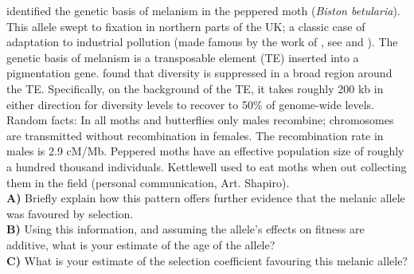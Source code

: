 \begin{question}{}
\citet{van2011industrial}  identified the genetic basis of
melanism in the peppered moth ({\it Biston betularia}). This allele swept to fixation in northern
parts of the UK; a classic case of adaptation to industrial pollution
(made famous by the work of \citeauthor{kettlewell1955selection}, see
\citet{majerus2009industrial} and \citet{cook2012selective}). The genetic basis of melanism
is a transposable element (TE) inserted into a pigmentation gene. \citeauthor{van2011industrial} found that diversity is suppressed in a broad region
around the TE. Specifically, on the background of the TE, it takes
roughly 200 kb in either direction for diversity levels to recover to
50\% of genome-wide levels. \\

Random facts: In all moths and butterflies only males recombine;
chromosomes are transmitted without recombination in females. The
recombination rate in males is 2.9 cM/Mb.  Peppered moths have an
effective population size of roughly a hundred thousand
individuals. Kettlewell used to eat moths when out collecting them in
the field (personal communication, Art. Shapiro). \\
{\bf A)} Briefly explain how this pattern offers further evidence that the melanic allele was favoured by selection.\\
{\bf B)} Using this information, and assuming the allele's effects on fitness are additive, what is your estimate of the age of the allele? \\
{\bf C)} What is your estimate of the selection coefficient favouring this melanic allele?
\end{question}
